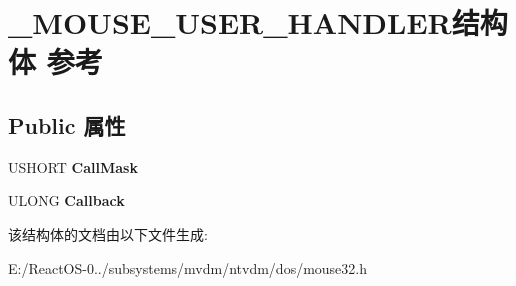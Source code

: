 \hypertarget{struct___m_o_u_s_e___u_s_e_r___h_a_n_d_l_e_r}{}\section{\+\_\+\+M\+O\+U\+S\+E\+\_\+\+U\+S\+E\+R\+\_\+\+H\+A\+N\+D\+L\+E\+R结构体 参考}
\label{struct___m_o_u_s_e___u_s_e_r___h_a_n_d_l_e_r}
\subsection*{Public 属性}
\begin{DoxyCompactItemize}
\item 
\mbox{\label{struct___m_o_u_s_e___u_s_e_r___h_a_n_d_l_e_r_a3ae7004af2eed90c299e3f409482b6ef}} 
U\+S\+H\+O\+RT {\bfseries Call\+Mask}
\item 
\mbox{\label{struct___m_o_u_s_e___u_s_e_r___h_a_n_d_l_e_r_a3e653f8ef67135df2f58b8323780a08e}} 
U\+L\+O\+NG {\bfseries Callback}
\end{DoxyCompactItemize}


该结构体的文档由以下文件生成\+:\begin{DoxyCompactItemize}
\item 
E\+:/\+React\+O\+S-\/0../subsystems/mvdm/ntvdm/dos/mouse32.\+h\end{DoxyCompactItemize}
